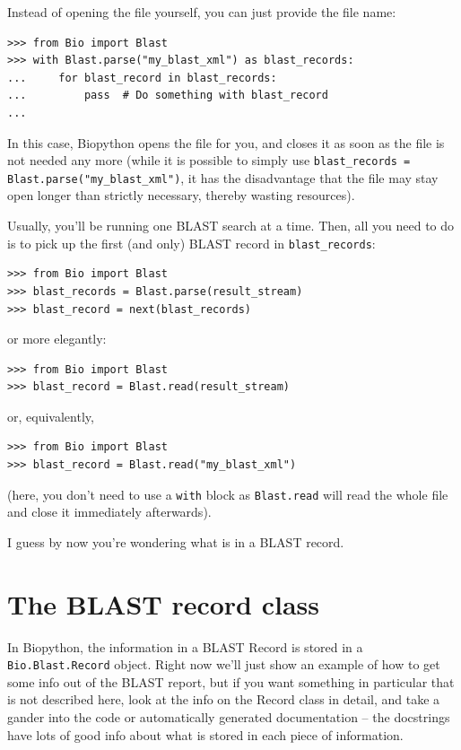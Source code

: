 Instead of opening the file yourself, you can just provide the file name:
\begin{verbatim}
>>> from Bio import Blast
>>> with Blast.parse("my_blast_xml") as blast_records:
...     for blast_record in blast_records:
...         pass  # Do something with blast_record
...
\end{verbatim}
In this case, Biopython opens the file for you, and closes it as soon as the file is not needed any more (while it is possible to simply use \verb|blast_records = Blast.parse("my_blast_xml")|, it has the disadvantage that the file may stay open longer than strictly necessary, thereby wasting resources).

Usually, you'll be running one BLAST search at a time. Then, all you need
to do is to pick up the first (and only) BLAST record in \verb|blast_records|:
\begin{verbatim}
>>> from Bio import Blast
>>> blast_records = Blast.parse(result_stream)
>>> blast_record = next(blast_records)
\end{verbatim}
\noindent or more elegantly:
\begin{verbatim}
>>> from Bio import Blast
>>> blast_record = Blast.read(result_stream)
\end{verbatim}
or, equivalently,
\begin{verbatim}
>>> from Bio import Blast
>>> blast_record = Blast.read("my_blast_xml")
\end{verbatim}
(here, you don't need to use a \verb|with| block as \verb|Blast.read| will read the whole file and close it immediately afterwards).

I guess by now you're wondering what is in a BLAST record.

\section{The BLAST record class}

In Biopython, the information in a BLAST Record is stored in a \verb|Bio.Blast.Record| object.  Right now we'll just show
an example of how to get some info out of the BLAST report, but if you
want something in particular that is not described here, look at the
info on the Record class in detail, and take a gander into the code or
automatically generated documentation -- the docstrings have lots of
good info about what is stored in each piece of information.

